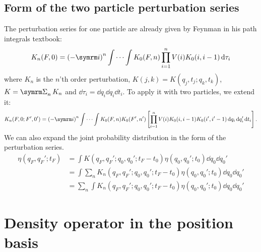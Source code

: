 \subsection{Form of the two particle perturbation series}

The perturbation series for one particle are already given by Feynman in his path integrals textbook:
\begin{equation}
    K_n(F, 0) = \left(-\im\right)^n\idotsint K_0(F, n)\prod_{i = 1}^n V(i)K_0(i, i - 1)\dd{\tau_i}
\end{equation}
where $K_n$ is the $n$'th order perturbation, $K(j, k) = K(q_j, t_j; q_k, t_k)$, $K = \ssum_nK_n$ and $\dd{\tau_i} = \dd{q_i}\dd{q_i}\dd{t_i}$. To apply it with two particles, we extend it:
\begin{equation}
    K_n(F, 0; F', 0') = \left(-\im\right)^n\idotsint K_0(F, n)K_0(F', n')\left[\prod_{i = 1}^nV(i)K_0(i, i - 1)K_0(i', i' - 1)\dd{q_i}\dd{q_i'}\dd{t_i}\right]. \label{eq:generaltwoparticleperturbation}
\end{equation}
We can also expand the joint probability distribution in the form of the perturbation series.
\begin{align}
    \eta(q_F, q_F'; t_F) &= \int K(q_F, q_F'; q_0, q_0'; t_F - t_0)\eta(q_0, q_0'; t_0)\dd{q_0}\dd{q_0'} \\
    &= \int \sum_n K_n(q_F, q_F'; q_0, q_0'; t_F - t_0)\eta(q_0, q_0'; t_0) \dd{q_0}\dd{q_0'} \\
    &= \sum_n \int K_n(q_F, q_F'; q_0, q_0'; t_F - t_0)\eta(q_0, q_0'; t_0) \dd{q_0}\dd{q_0'}
\end{align}

\section{Density operator in the position basis}

